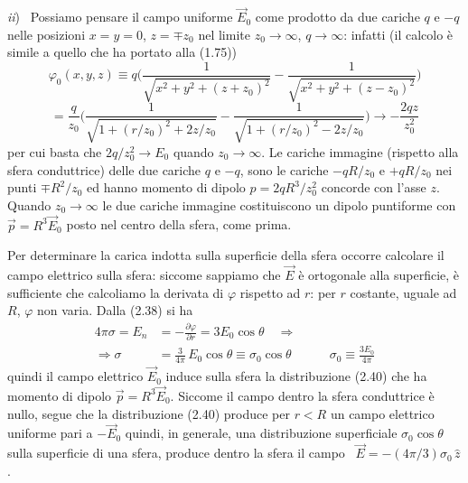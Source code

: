 \begin{enumerate}
    \textit{ii}) \ Possiamo pensare il campo uniforme $\vec E_0$ come prodotto
    da due cariche $q$ e $-q$ nelle posizioni $x=y=0$, $z=\mp z_0$ nel limite
    $z_0\to\infty$, $q\to\infty$: infatti \big(il calcolo \`e simile a quello
    che ha portato alla (1.75)\big)
    \[
      \varphi_0(x,y,z)\equiv q\Big(\frac{1}{\sqrt{x^2+y^2+(z+z_0)^2}}
      -\frac{1}{\sqrt{x^2+y^2+(z-z_0)^2}}\Big)
    \]
    \begin{equation}
      =\frac{q}{z_0}\Big(\frac{1}{\sqrt{1+(r/z_0)^2+2z/z_0}}
      -\frac{1}{\sqrt{1+(r/z_0)^2-2z/z_0}}\Big)\to-\frac{2qz}{z_0^2}
      \tag{2.39}
    \end{equation}
    per cui basta che $2q/z_0^2\to E_0$ quando $z_0\to\infty$. Le cariche
    immagine (rispetto alla sfera conduttrice) delle due cariche $q$ e $-q$,
    sono le cariche $-qR/z_0$ e $+qR/z_0$ nei punti $\mp R^2/z_0$ ed hanno
    momento di dipolo $p=2qR^3/z_0^2$ concorde con l'asse $z$. Quando
    $z_0\to\infty$ le due cariche immagine costituiscono un dipolo puntiforme
    con $\vec p=R^3\vec E_0$ posto nel centro della sfera, come prima.

    Per determinare la carica indotta sulla superficie della sfera occorre
    calcolare il campo elettrico sulla sfera: siccome sappiamo che $\vec E$ \`e
    ortogonale alla superficie, \`e sufficiente che calcoliamo la derivata di
    $\varphi$ rispetto ad $r$: per $r$ costante, uguale ad $R$, $\varphi$ non
    varia. Dalla (2.38) si ha
    \begin{equation}
      \begin{aligned}
        4\pi\sigma=E_n&=-\frac{\partial\varphi}{\partial r}=3E_0\cos\theta
        \quad\Rightarrow\\
        \Rightarrow\sigma&=\frac{3}{4\pi}\,E_0\cos\theta\equiv\sigma_0\cos\theta
        \qquad\quad\sigma_0\equiv\frac{3E_0}{4\pi}
      \end{aligned}
      \tag{2.40}
    \end{equation}
    quindi il campo elettrico $\vec E_0$ induce sulla sfera la distribuzione
    (2.40) che ha momento di dipolo $\vec p=R^3\vec E_0$. Siccome il campo
    dentro la sfera conduttrice \`e nullo, segue che la distribuzione (2.40)
    produce per $r<R$ un campo elettrico uniforme pari a $-\vec E_0$ quindi, in
    generale, una distribuzione superficiale $\sigma_0\cos\theta$ sulla
    superficie di una sfera, produce dentro la sfera il campo
    \ $\vec E=-(4\pi/3)\sigma_0\,\hat z$.
\end{enumerate}

